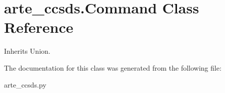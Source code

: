 \section{arte\+\_\+ccsds.\+Command Class Reference}
\label{classarte__ccsds_1_1_command}


Inherits Union.



The documentation for this class was generated from the following file\+:\begin{DoxyCompactItemize}
\item 
arte\+\_\+ccsds.\+py\end{DoxyCompactItemize}
